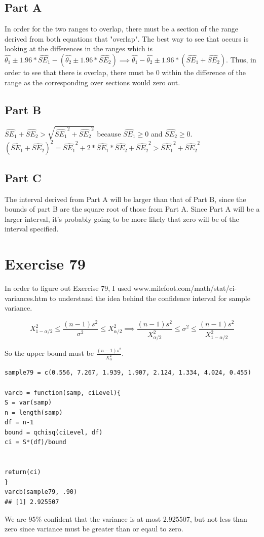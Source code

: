 \documentclass{article}\usepackage[]{graphicx}\usepackage[]{color}
\makeatletter
\newenvironment{kframe}{%
 \def\at@end@of@kframe{}%
 \ifinner\ifhmode%
  \def\at@end@of@kframe{\end{minipage}}%
  \begin{minipage}{\columnwidth}%
 \fi\fi%
 \def\FrameCommand##1{\hskip\@totalleftmargin \hskip-\fboxsep
 \colorbox{shadecolor}{##1}\hskip-\fboxsep
     \hskip-\linewidth \hskip-\@totalleftmargin \hskip\columnwidth}%
 \MakeFramed {\advance\hsize-\width
   \@totalleftmargin\z@ \linewidth\hsize
   \@setminipage}}%
 {\par\unskip\endMakeFramed%
 \at@end@of@kframe}
\newenvironment{knitrout}{}{} %
\makeatother
\begin{document}
\subsection*{Part A}
In order for the two ranges to overlap, there must be a section of the range derived from both equations that "overlap". The best way to see that occurs is looking at the differences in the ranges which is $\hat{\theta_{1}}\pm 1.96*\hat{SE_{1}}-(\hat{\theta_{2}}\pm 1.96*\hat{SE_{2}})\implies\hat{\theta_{1}}-\hat{\theta_{2}}\pm 1.96*(\hat{SE_{1}}+\hat{SE_{2}})$.
Thus, in order to see that there is overlap, there must be 0 within the difference of the range as the corresponding over sections would zero out.

\subsection*{Part B}
$\hat{SE_{1}}+\hat{SE_{2}}>\sqrt{\hat{SE_{1}}^2+\hat{SE_{2}}^2}$ because $\hat{SE_{1}}\geq 0$ and $\hat{SE_{2}}\geq 0$.
$(\hat{SE_{1}}+\hat{SE_{2}})^2=\hat{SE_{1}}^2+2*\hat{SE_{1}}*\hat{SE_{2}}+\hat{SE_{2}}^2>\hat{SE_{1}}^2+\hat{SE_{2}}^2$

\subsection*{Part C}
The interval derived from Part A will be larger than that of Part B, since the bounds of part B are the square root of those from Part A. Since Part A will be a larger interval, it's probably going to be more likely that zero will be of the interval specified.


\section*{Exercise 79}
In order to figure out Exercise 79, I used www.milefoot.com/math/stat/ci-variances.htm to understand the idea behind the confidence interval for sample variance.

\begin{equation}
X_{1-\alpha/2}^{2}\leq\frac{(n-1)s^{2}}{\sigma^{2}}\leq X_{\alpha/2}^{2}\implies\frac{(n-1)s^{2}}{X_{\alpha/2}^{2}}\leq\sigma^{2}\leq\frac{(n-1)s^{2}}{X_{1-\alpha/2}^{2}}
\end{equation}


So the upper bound must be $\frac{(n-1)s^{2}}{X_{\alpha}^{2}}$.
\begin{knitrout}
\color{fgcolor}\begin{kframe}
\begin{verbatim}
sample79 = c(0.556, 7.267, 1.939, 1.907, 2.124, 1.334, 4.024, 0.455)

varcb = function(samp, ciLevel){
S = var(samp)
n = length(samp)
df = n-1
bound = qchisq(ciLevel, df)
ci = S*(df)/bound


return(ci)
}
varcb(sample79, .90)
## [1] 2.925507
\end{verbatim}
\end{kframe}
\end{knitrout}
We are 95\% confident that the variance is at most 2.925507, but not less than zero since variance must be greater than or eqaul to zero.
\end{document}

